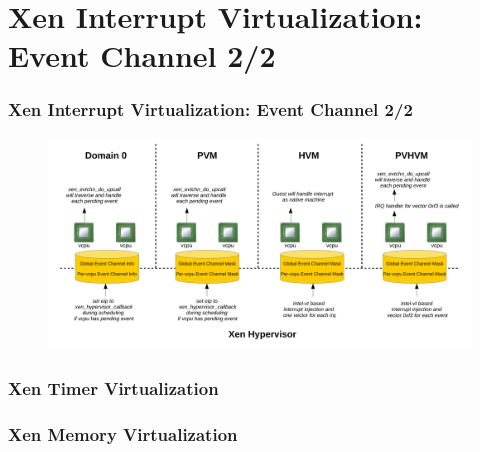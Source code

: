 \documentclass[aspectratio=169]{beamer}
\begin{document}

\section{Xen Interrupt Virtualization: Event Channel 2/2}
\begin{frame}
\frametitle{Xen Interrupt Virtualization: Event Channel 2/2}
\begin{figure}
\includegraphics[width=1.0\linewidth]{figures/evtchn.pdf}
\end{figure}
\end{frame}


\begin{frame}
\frametitle{Xen Timer Virtualization}
\end{frame}


\begin{frame}
\frametitle{Xen Memory Virtualization}
\end{frame}

\end{document}
